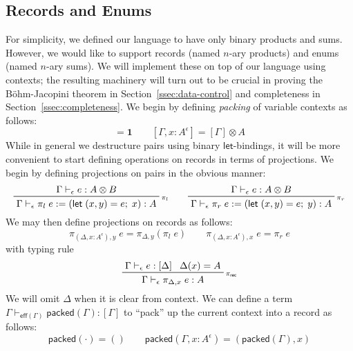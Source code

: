 \documentclass[acmsmall,screen,review]{acmart}
\newcommand{\mb}[1]{\ensuremath{\mathbf{#1}}}
\newcommand{\ms}[1]{\ensuremath{\mathsf{#1}}}
\newcommand{\letexpr}[3]{\ensuremath{\ms{let}\;#1 = #2;\;#3}}
\newcommand{\thyp}[3]{#1 : {#2}^{#3}}
\newcommand{\rle}[1]{{\scriptsize\textsf{#1}}}
\newcommand{\hasty}[4]{#1 \vdash_{#2} #3: {#4}}
\begin{document}
\subsection{Records and Enums}

\label{ssec:records-enums}

For simplicity, we defined our language to have only binary products and sums. However, we would
like to support records (named $n$-ary products) and enums (named $n$-ary sums). We will implement
these on top of our language using contexts; the resulting machinery will turn out to be crucial in
proving the B\"ohm-Jacopini theorem in Section~\ref{ssec:data-control} and completeness in
Section~\ref{ssec:completeness}. We begin by defining \emph{packing} of variable contexts as
follows:
\begin{equation}
  [\cdot] = \mb{1} \qquad [\Gamma, \thyp{x}{A}{\epsilon}] = [\Gamma] \otimes A
\end{equation}
While in general we destructure pairs using binary \ms{let}-bindings, it will be more convenient
to start defining operations on records in terms of projections. We begin by defining projections
on pairs in the obvious manner:
\begin{equation}
  \prftree[r]{\rle{$\pi_l$}}
    {\hasty{\Gamma}{\epsilon}{e}{A \otimes B}}
    {\hasty{\Gamma}{\epsilon}{\pi_l\;e := (\letexpr{(x, y)}{e}{x})}{A}}
  \qquad
  \prftree[r]{\rle{$\pi_r$}}
    {\hasty{\Gamma}{\epsilon}{e}{A \otimes B}}
    {\hasty{\Gamma}{\epsilon}{\pi_r\;e := (\letexpr{(x, y)}{e}{y})}{A}}
\end{equation}
We may then define projections on records as follows:
\begin{equation}
  \pi_{(\Delta, \thyp{x}{A}{\epsilon}), y}\;e = \pi_{\Delta, y}(\pi_l\;e) \qquad
  \pi_{(\Delta, \thyp{x}{A}{\epsilon}), x}\;e = \pi_r\;e
\end{equation}
with typing rule
\begin{equation}
  \prftree[r]{\rle{$\pi_{\ms{rec}}$}}
    {\hasty{\Gamma}{\epsilon}{e}{[\Delta]}}
    {\Delta(x) = A}
    {\hasty{\Gamma}{\epsilon}{\pi_{\Delta, x}\;e}{A}}
\end{equation}
We will omit $\Delta$ when it is clear from context. We can define a term
$\hasty{\Gamma}{\ms{eff}(\Gamma)}{\ms{packed}(\Gamma)}{[\Gamma]}$ to ``pack'' up the current context
into a record as follows:
\begin{equation}
  \ms{packed}(\cdot) = () \qquad
  \ms{packed}(\Gamma, \thyp{x}{A}{\epsilon}) = (\ms{packed}(\Gamma), x)
\end{equation}
\end{document}
